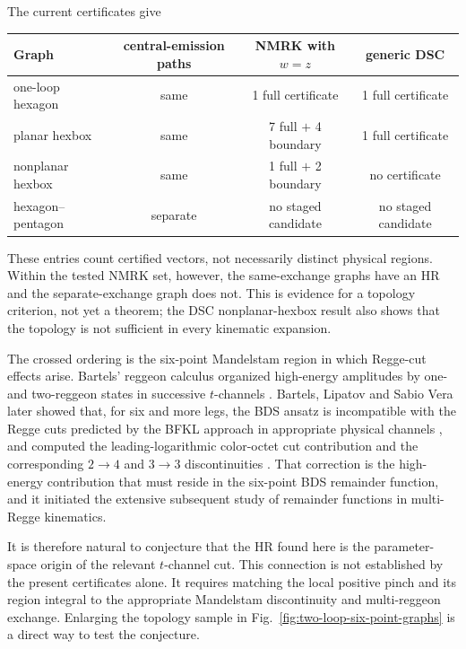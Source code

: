 \documentclass[a4paper,11pt]{article}
\begin{document}
The current certificates give
\begin{center}
\small
\begin{tabular}{@{}lccc@{}}
\toprule
Graph & central-emission paths & NMRK with \(w=z\) & generic DSC\\
\midrule
one-loop hexagon & same & 1 full certificate & 1 full certificate\\
planar hexbox & same & 7 full \(+\) 4 boundary & 1 full certificate\\
nonplanar hexbox & same & 1 full \(+\) 2 boundary & no certificate\\
hexagon--pentagon & separate & no staged candidate & no staged candidate\\
\bottomrule
\end{tabular}
\end{center}
These entries count certified vectors, not necessarily distinct physical
regions.  Within the tested NMRK set, however, the same-exchange graphs have
an HR and the separate-exchange graph does not.  This is evidence for a
topology criterion, not yet a theorem; the DSC nonplanar-hexbox result also
shows that the topology is not sufficient in every kinematic expansion.

The crossed ordering is the six-point Mandelstam region in which Regge-cut
effects arise.  Bartels' reggeon calculus organized high-energy amplitudes
by one- and two-reggeon states in successive \(t\)-channels
\cite{Bartels1980}.  Bartels, Lipatov and Sabio Vera later showed that, for
six and more legs, the BDS ansatz is incompatible with the Regge cuts
predicted by the BFKL approach in appropriate physical channels
\cite{BartelsLipatovSabioVera2008a}, and computed the leading-logarithmic
color-octet cut contribution and the corresponding \(2\to4\) and \(3\to3\)
discontinuities \cite{BartelsLipatovSabioVera2008b}.
That correction is the high-energy contribution that must reside in the
six-point BDS remainder function, and it initiated the extensive subsequent
study of remainder functions in multi-Regge kinematics.

It is therefore natural to conjecture that the HR found here is the
parameter-space origin of the relevant \(t\)-channel cut.  This connection
is not established by the present certificates alone.  It requires matching
the local positive pinch and its region integral to the appropriate
Mandelstam discontinuity and multi-reggeon exchange.  Enlarging the topology
sample in Fig.~\ref{fig:two-loop-six-point-graphs} is a direct way to test
the conjecture.
\end{document}
